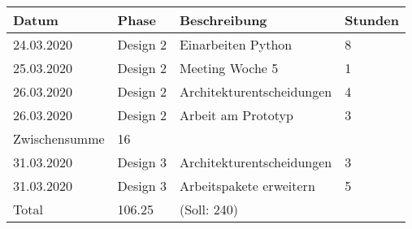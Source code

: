 \documentclass[
	ngerman,
	toc=listof, %
	toc=bibliography, %
	footnotes=multiple, %
	parskip=half, %
	numbers=noendperiod %
]{scrartcl}
\begin{document}
	\newpage

	\begin{tabularx}{\textwidth}{llXl}
		\toprule
		Datum & Phase & Beschreibung & Stunden \\
		\midrule
		24.03.2020 & Design 2 & Einarbeiten Python & 8 \\
		25.03.2020 & Design 2 & Meeting Woche 5 & 1 \\
		26.03.2020 & Design 2 & Architekturentscheidungen & 4 \\
		26.03.2020 & Design 2 & Arbeit am Prototyp & 3 \\
		\midrule
		Zwischensumme & 16 & & \\
		\midrule
		31.03.2020 & Design 3 & Architekturentscheidungen & 3 \\
		31.03.2020 & Design 3 & Arbeitspakete erweitern &  5 \\
		\midrule
		Total & 106.25 & (Soll: 240) & \\
		\bottomrule
	\end{tabularx}
\end{document}
